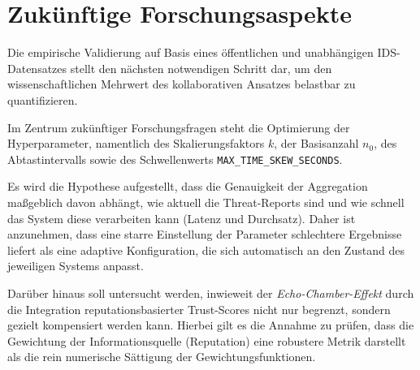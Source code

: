 \section{Zukünftige Forschungsaspekte}

Die empirische Validierung auf Basis eines öffentlichen und unabhängigen IDS-Datensatzes stellt den nächsten notwendigen Schritt dar, um den wissenschaftlichen Mehrwert des kollaborativen Ansatzes belastbar zu quantifizieren. 

Im Zentrum zukünftiger Forschungsfragen steht die Optimierung der Hyperparameter, namentlich des Skalierungsfaktors $k$, der Basisanzahl $n_0$, des Abtastintervalls sowie des Schwellenwerts \texttt{MAX\_TIME\_SKEW\_SECONDS}.

Es wird die Hypothese aufgestellt, dass die Genauigkeit der Aggregation maßgeblich davon abhängt, wie aktuell die Threat-Reports sind und wie schnell das System diese verarbeiten kann (Latenz und Durchsatz). Daher ist anzunehmen, dass eine starre Einstellung der Parameter schlechtere Ergebnisse liefert als eine adaptive Konfiguration, die sich automatisch an den Zustand des jeweiligen Systems anpasst.

Darüber hinaus soll untersucht werden, inwieweit der \textit{Echo-Chamber-Effekt} durch die Integration reputationsbasierter Trust-Scores nicht nur begrenzt, sondern gezielt kompensiert werden kann. Hierbei gilt es die Annahme zu prüfen, dass die Gewichtung der Informationsquelle (Reputation) eine robustere Metrik darstellt als die rein numerische Sättigung der Gewichtungsfunktionen.